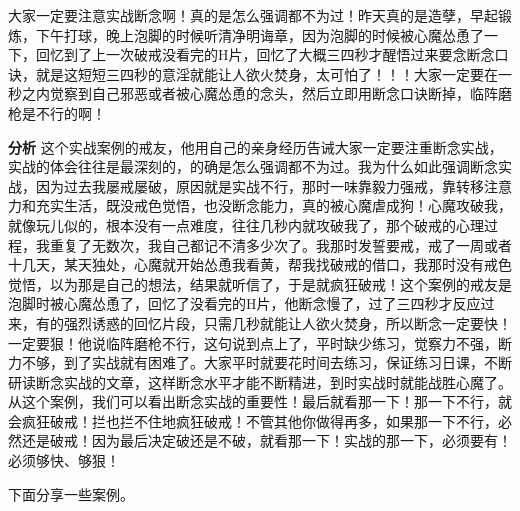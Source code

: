 \begin{case}
    大家一定要注意实战断念啊！真的是怎么强调都不为过！昨天真的是造孽，早起锻炼，下午打球，晚上泡脚的时候听清净明诲章，因为泡脚的时候被心魔怂恿了一下，回忆到了上一次破戒没看完的H片，回忆了大概三四秒才醒悟过来要念断念口诀，就是这短短三四秒的意淫就能让人欲火焚身，太可怕了！！！大家一定要在一秒之内觉察到自己邪恶或者被心魔怂恿的念头，然后立即用断念口诀断掉，临阵磨枪是不行的啊！

    \textbf{分析} 这个实战案例的戒友，他用自己的亲身经历告诫大家一定要注重断念实战，实战的体会往往是最深刻的，的确是怎么强调都不为过。我为什么如此强调断念实战，因为过去我屡戒屡破，原因就是实战不行，那时一味靠毅力强戒，靠转移注意力和充实生活，既没戒色觉悟，也没断念能力，真的被心魔虐成狗！心魔攻破我，就像玩儿似的，根本没有一点难度，往往几秒内就攻破我了，那个破戒的心理过程，我重复了无数次，我自己都记不清多少次了。我那时发誓要戒，戒了一周或者十几天，某天独处，心魔就开始怂恿我看黄，帮我找破戒的借口，我那时没有戒色觉悟，以为那是自己的想法，结果就听信了，于是就疯狂破戒！这个案例的戒友是泡脚时被心魔怂恿了，回忆了没看完的H片，他断念慢了，过了三四秒才反应过来，有的强烈诱惑的回忆片段，只需几秒就能让人欲火焚身，所以断念一定要快！一定要狠！他说临阵磨枪不行，这句说到点上了，平时缺少练习，觉察力不强，断力不够，到了实战就有困难了。大家平时就要花时间去练习，保证练习日课，不断研读断念实战的文章，这样断念水平才能不断精进，到时实战时就能战胜心魔了。从这个案例，我们可以看出断念实战的重要性！最后就看那一下！那一下不行，就会疯狂破戒！拦也拦不住地疯狂破戒！不管其他你做得再多，如果那一下不行，必然还是破戒！因为最后决定破还是不破，就看那一下！实战的那一下，必须要有！必须够快、够狠！
\end{case}

下面分享一些案例。

